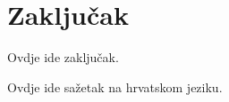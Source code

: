 \documentclass[times, utf8, diplomski, numeric]{templates/template}
\begin{document}
\chapter{Zaključak}{
    Ovdje ide zaključak.
}




\begin{sazetak}{
    Ovdje ide sažetak na hrvatskom jeziku.
}

\end{sazetak}

\begin{abstract}{
    Add abstract here.
}

\end{abstract}
\end{document}

